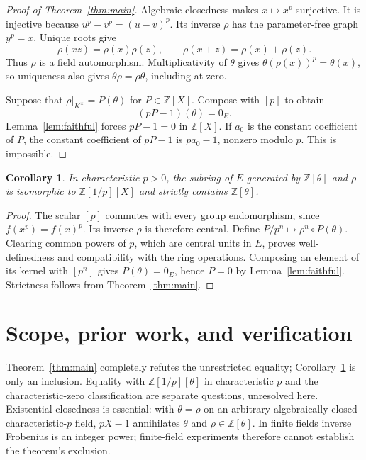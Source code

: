 \documentclass[11pt,a4paper]{article}
\newtheorem{corollary}[theorem]{Corollary}
\newcommand{\Z}{\mathbb Z}
\begin{document}
\begin{proof}[Proof of Theorem~\ref{thm:main}]
Algebraic closedness makes $x\mapsto x^p$ surjective.
It is injective because $u^p-v^p=(u-v)^p$.
Its inverse $\rho$ has the parameter-free graph $y^p=x$.
Unique roots give
\[
 \rho(xz)=\rho(x)\rho(z),\qquad
 \rho(x+z)=\rho(x)+\rho(z).
\]
Thus $\rho$ is a field automorphism. Multiplicativity of $\theta$ gives
$\theta(\rho(x))^p=\theta(x)$, so uniqueness also gives
$\theta\rho=\rho\theta$, including at zero.

Suppose that $\rho|_{K^\times}=P(\theta)$ for $P\in\Z[X]$.
Compose with $[p]$ to obtain
\[
 (pP-1)(\theta)=0_E.
\]
Lemma~\ref{lem:faithful} forces $pP-1=0$ in $\Z[X]$.
If $a_0$ is the constant coefficient of $P$, the constant coefficient
of $pP-1$ is $pa_0-1$, nonzero modulo $p$.
This is impossible.
\end{proof}

\begin{corollary}\label{cor:localized}
In characteristic $p>0$, the subring of $E$ generated by
$\Z[\theta]$ and $\rho$ is isomorphic to $\Z[1/p][X]$ and
strictly contains $\Z[\theta]$.
\end{corollary}
\begin{proof}
The scalar $[p]$ commutes with every group endomorphism, since
$f(x^p)=f(x)^p$. Its inverse $\rho$ is therefore central.
Define $P/p^n\mapsto\rho^n\circ P(\theta)$.
Clearing common powers of $p$, which are central units in $E$,
proves well-definedness and compatibility with the ring operations.
Composing an element of its kernel with $[p^n]$ gives
$P(\theta)=0_E$, hence $P=0$ by Lemma~\ref{lem:faithful}.
Strictness follows from Theorem~\ref{thm:main}.
\end{proof}

\section{Scope, prior work, and verification}
Theorem~\ref{thm:main} completely refutes the unrestricted equality;
Corollary~\ref{cor:localized} is only an inclusion.
Equality with $\Z[1/p][\theta]$ in characteristic $p$ and the
characteristic-zero classification are separate questions, unresolved
here. Existential closedness is essential: with $\theta=\rho$ on
an arbitrary algebraically closed characteristic-$p$ field,
$pX-1$ annihilates $\theta$ and $\rho\in\Z[\theta]$.
In finite fields inverse Frobenius is an integer power; finite-field
experiments therefore cannot establish the theorem's exclusion.
\end{document}
